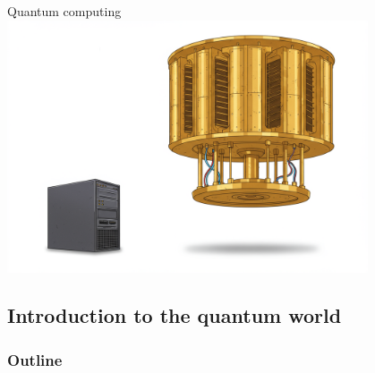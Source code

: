 \documentclass{beamer}
\begin{document}
\begin{frame}{Quantum computing}
	\centering
	\includegraphics[width=0.8\textwidth]{classical-vs-quantum.png}
\end{frame}

\subsection{Introduction to the quantum world}
\begin{frame}
  \frametitle{Outline}
\end{frame}
\end{document}
